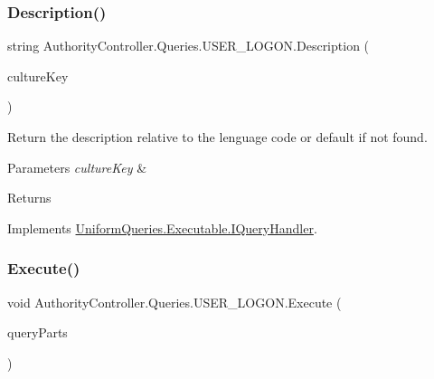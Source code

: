 \subsubsection{\texorpdfstring{Description()}{Description()}}
{\footnotesize\ttfamily string Authority\+Controller.\+Queries.\+U\+S\+E\+R\+\_\+\+L\+O\+G\+O\+N.\+Description (\begin{DoxyParamCaption}\item[{string}]{culture\+Key }\end{DoxyParamCaption})}



Return the description relative to the lenguage code or default if not found. 


\begin{DoxyParams}{Parameters}
{\em culture\+Key} & \\
\hline
\end{DoxyParams}
\begin{DoxyReturn}{Returns}

\end{DoxyReturn}


Implements \mbox{\hyperlink{interface_uniform_queries_1_1_executable_1_1_i_query_handler_ae0e55919571d5456af31298394d241a9}{Uniform\+Queries.\+Executable.\+I\+Query\+Handler}}.

\mbox{\label{class_authority_controller_1_1_queries_1_1_u_s_e_r___l_o_g_o_n_a001f81c71597259636be777078e50f7e}} 
\subsubsection{\texorpdfstring{Execute()}{Execute()}}
{\footnotesize\ttfamily void Authority\+Controller.\+Queries.\+U\+S\+E\+R\+\_\+\+L\+O\+G\+O\+N.\+Execute (\begin{DoxyParamCaption}\item[{\mbox{\hyperlink{struct_uniform_queries_1_1_query_part}{Query\+Part}} \mbox{[}$\,$\mbox{]}}]{query\+Parts }\end{DoxyParamCaption})}



